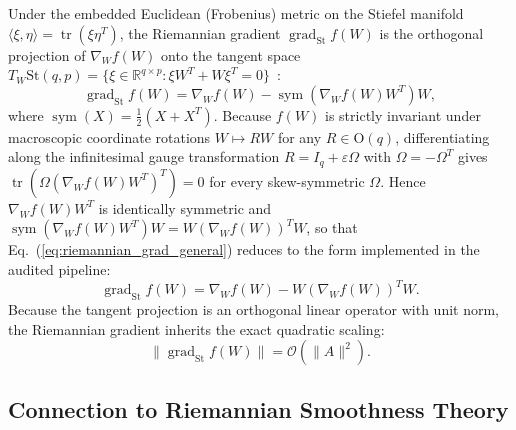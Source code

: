 \documentclass[preprint,12pt]{elsarticle}
\begin{document}
Under the embedded Euclidean (Frobenius) metric on the Stiefel manifold $\langle \xi, \eta \rangle = \operatorname{tr}(\xi \eta^T)$, the Riemannian gradient $\operatorname{grad}_{\mathrm{St}} f(W)$ is the orthogonal projection of $\nabla_W f(W)$ onto the tangent space $T_W \mathrm{St}(q, p) = \{ \xi \in \mathbb{R}^{q \times p} : \xi W^T + W \xi^T = 0 \}$~\cite{Edelman1998,Absil2008}:
\begin{equation}
\operatorname{grad}_{\mathrm{St}} f(W) = \nabla_W f(W) - \operatorname{sym}\!\left( \nabla_W f(W) W^T \right) W,
\label{eq:riemannian_grad_general}
\end{equation}
where $\operatorname{sym}(X) = \frac{1}{2}(X + X^T)$. Because $f(W)$ is strictly invariant under macroscopic coordinate rotations $W \mapsto R W$ for any $R \in \mathrm{O}(q)$, differentiating along the infinitesimal gauge transformation $R = I_q + \varepsilon \Omega$ with $\Omega = -\Omega^T$ gives $\operatorname{tr}\!\left( \Omega \left( \nabla_W f(W) W^T \right)^T \right) = 0$ for every skew-symmetric $\Omega$. Hence $\nabla_W f(W) W^T$ is identically symmetric and $\operatorname{sym}(\nabla_W f(W) W^T) W = W (\nabla_W f(W))^T W$, so that Eq.~(\ref{eq:riemannian_grad_general}) reduces to the form implemented in the audited pipeline:
\begin{equation}
\operatorname{grad}_{\mathrm{St}} f(W) = \nabla_W f(W) - W (\nabla_W f(W))^T W.
\label{eq:riemannian_grad}
\end{equation}
Because the tangent projection is an orthogonal linear operator with unit norm, the Riemannian gradient inherits the exact quadratic scaling:
\begin{equation}
\| \operatorname{grad}_{\mathrm{St}} f(W) \| = \mathcal{O}(\|A\|^2).
\label{eq:riemannian_grad_scaling}
\end{equation}

\subsection{Connection to Riemannian Smoothness Theory}
\end{document}
